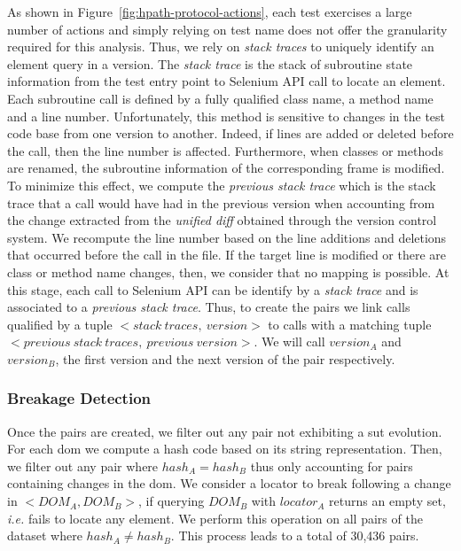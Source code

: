 As shown in Figure~\ref{fig:hpath-protocol-actions}, each test exercises a large number of actions and simply relying on test name does not offer the granularity required for this analysis. Thus, we rely on \emph{stack traces} to uniquely identify an element query in a version. The \emph{stack trace} is the stack of subroutine state information from the test entry point to Selenium API call to locate an element. Each subroutine call is defined by a fully qualified class name, a method name and a line number. Unfortunately, this method is sensitive to changes in the test code base from one version to another. Indeed, if lines are added or deleted before the call, then the line number is affected. Furthermore, when classes or methods are renamed, the subroutine information of the corresponding frame is modified. To minimize this effect, we compute the \emph{previous stack trace} which is the stack trace that a call would have had in the previous version when accounting from the change extracted from the \emph{unified diff} obtained through the version control system. We recompute the line number based on the line additions and deletions that occurred before the call in the file. If the target line is modified or there are class or method name changes, then, we consider that no mapping is possible. At this stage, each call to Selenium API can be identify by a \emph{stack trace} and is associated to a \emph{previous stack trace}. Thus, to create the pairs we link calls qualified by a tuple $<stack\:traces,\:version>$ to calls with a matching tuple $<previous\:stack\:traces,\:previous\:version>$. We will call $version_A$ and $version_B$, the first version and the next version of the pair respectively.

\subsubsection{Breakage Detection}
\label{sec:hpath-protocol-breakage-detection}

Once the pairs are created, we filter out any pair not exhibiting a \gls{sut} evolution. For each \gls{dom} we compute a hash code based on its string representation. Then, we filter out any pair where $hash_A = hash_B$ thus only accounting for pairs containing changes in the \gls{dom}. We consider a locator to break following a change in $<DOM_A, DOM_B>$, if querying $DOM_B$ with $locator_A$ returns an empty set, \emph{i.e.} fails to locate any element. We perform this operation on all pairs of the dataset where $hash_A \neq hash_B$. This process leads to a total of 30,436 pairs.

